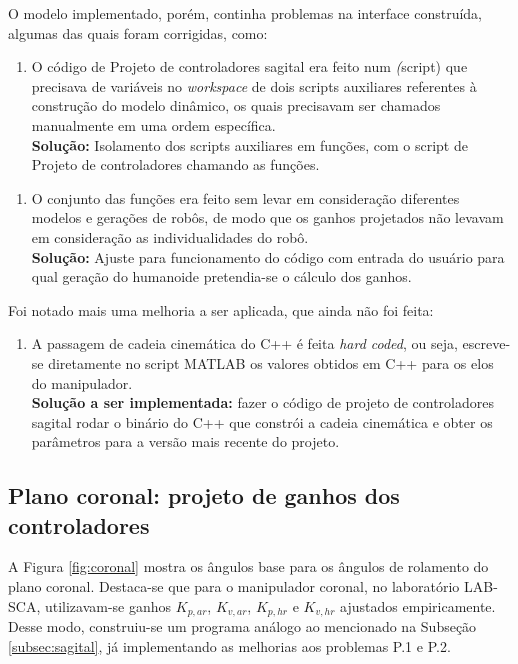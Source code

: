 O modelo implementado, porém, continha problemas na interface construída, algumas das quais foram corrigidas, como:
\begin{enumerate}[\textbf{P.1.}]
\item O código de Projeto de controladores sagital era feito num \emph(script) que precisava de variáveis no \textit{workspace} de dois scripts auxiliares referentes à construção do modelo dinâmico, os quais precisavam ser chamados manualmente em uma ordem específica.\\
\textbf{Solução:} Isolamento dos scripts auxiliares em funções, com o script de Projeto de controladores chamando as funções.
\end{enumerate}
\begin{enumerate}[\textbf{P.2.}]
\item O conjunto das funções era feito sem levar em consideração diferentes modelos e gerações de robôs, de modo que os ganhos projetados não levavam em consideração as individualidades do robô.\\
\textbf{Solução:} Ajuste para funcionamento do código com entrada do usuário para qual geração do humanoide pretendia-se o cálculo dos ganhos.
\end{enumerate} 
Foi notado mais uma melhoria a ser aplicada, que ainda não foi feita:
\begin{enumerate}[\textbf{P.3.}]
\item A passagem de cadeia cinemática do C++ é feita \textit{hard coded}, ou seja, escreve-se diretamente no script MATLAB os valores obtidos em C++ para os elos do manipulador.\\
\textbf{Solução a ser implementada:} fazer o código de projeto de controladores sagital rodar o binário do C++ que constrói a cadeia cinemática e obter os parâmetros para a versão mais recente do projeto.
\end{enumerate} 


\subsection{Plano coronal: projeto de ganhos dos controladores}

A Figura \ref{fig:coronal} mostra os ângulos base para os ângulos de rolamento do plano coronal. Destaca-se que para o manipulador coronal, no laboratório LAB-SCA, utilizavam-se ganhos \( K_{p,ar} \), \( K_{v,ar} \), \( K_{p,hr} \) e \( K_{v,hr} \) ajustados empiricamente. Desse modo, construiu-se um programa análogo ao mencionado na Subseção \ref{subsec:sagital}, já implementando as melhorias aos problemas P.1 e P.2.

